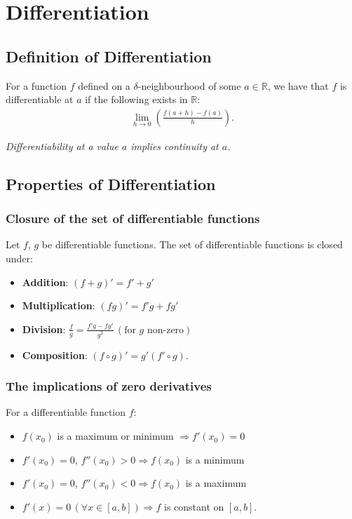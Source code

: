 \documentclass[a4paper, 12pt, twoside]{article}
\begin{document}
\section{Differentiation}

\subsection{Definition of Differentiation}

For a function $f$ defined on a $\delta$-neighbourhood of some
$a \in \mathbb{R}$, we have that $f$ is differentiable at $a$ if
the following exists in $\mathbb{R}$:
\begin{align*}
      \lim_{h\to 0}\left(\frac{f(a + h) - f(a)}{h}\right).
\end{align*}

\textit{Differentiability at a value $a$ implies continuity at $a$.}

\subsection{Properties of Differentiation}

\subsubsection{Closure of the set of differentiable functions}

Let $f$, $g$ be differentiable functions. The set of differentiable
functions is closed under:

\begin{itemize}
      \item \textbf{Addition}: $(f + g)' = f' + g'$
      \item \textbf{Multiplication}: $(fg)' = f'g + fg'$
      \item \textbf{Division}: $\frac{f}{g} =
                  \frac{f'g - fg'}{g^2} \, (\text{for $g$ non-zero})$
      \item \textbf{Composition}: $(f \circ g)' = g'(f' \circ g)$.
\end{itemize}

\subsubsection{The implications of zero derivatives}

For a differentiable function $f$:

\begin{itemize}
      \item $f(x_0)$ is a maximum or minimum $\Rightarrow
                  f'(x_0) = 0$
      \item $f'(x_0) = 0$, $f''(x_0) > 0 \Rightarrow f(x_0)$ is
            a minimum
      \item $f'(x_0) = 0$, $f''(x_0) < 0 \Rightarrow f(x_0)$ is
            a maximum
      \item $f'(x) = 0 \, (\forall x \in [a, b]) \Rightarrow
                  f$ is constant on $[a, b]$.
\end{itemize}
\end{document}
